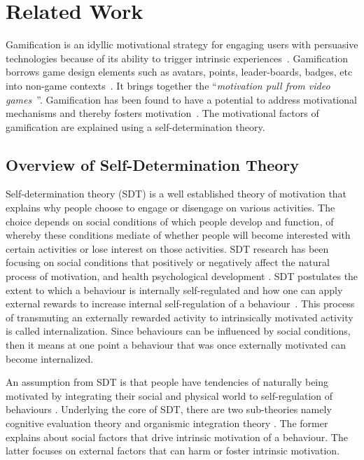 \documentclass{sig-alternate}
\begin{document}
\section{Related Work} 
Gamification is an idyllic motivational strategy for engaging users with persuasive technologies because of its ability to trigger intrinsic experiences~\cite{hamari2014persuasive}. Gamification borrows game design elements such as avatars, points, leader-boards, badges, etc into non-game contexts~\cite{deterding2011game}. It brings together the ``\emph{motivation pull from video games}~\cite{ryan2006:motivationalpull}''. Gamification has been found to have a potential to address motivational mechanisms and thereby fosters motivation~\cite{sailer2013:psychological}. The motivational  factors of gamification are explained using a self-determination theory\cite{deci1985:intrinsic}.    
\subsection{Overview of Self-Determination Theory}
Self-determination theory (SDT) is a well established theory of motivation that explains why people choose to engage or disengage on various activities. The choice depends on social conditions of which people develop and function, of whereby these conditions mediate of whether people will become interested with certain activities or lose interest on those activities. SDT research has been focusing on social conditions that positively or negatively affect the natural process of motivation, and health psychological development \cite{ryan2000:self}. SDT postulates the extent to which a behaviour is internally self-regulated and how one can apply external rewards to increase internal self-regulation of a behaviour~\cite{ryan2000:self}. This process of transmuting an externally rewarded activity to intrinsically motivated activity is called internalization. Since behaviours can be influenced by social conditions, then it means at one point a behaviour that was once externally motivated can become internalized.

An assumption from SDT is that people have tendencies of naturally being motivated by integrating their social and physical world to self-regulation of behaviours \cite{lee2015:relating}. Underlying the core of SDT, there are two sub-theories namely cognitive evaluation theory and organismic integration theory \cite{ryan2000:self}. The former explains about social factors that drive intrinsic motivation of a behaviour. The latter focuses on external factors that can harm or foster intrinsic motivation.
\end{document}
